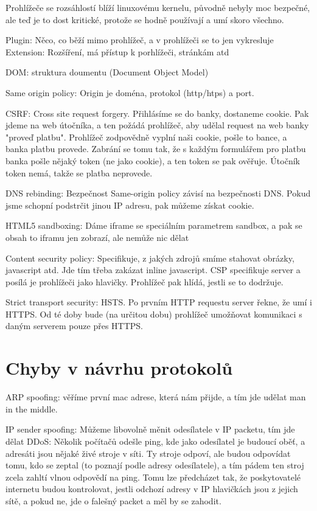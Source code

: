 Prohlížeče se rozsáhlostí blíží linuxovému kernelu, původně nebyly moc bezpečné, ale teď je to dost kritické, protože se hodně používají a umí skoro všechno.

Plugin: Něco, co běží mimo prohlížeč, a v prohlížeči se to jen vykresluje
Extension: Rozšíření, má přístup k porhlížeči, stránkám atd

DOM: struktura doumentu (Document Object Model)	

Same origin policy: Origin je doména, protokol (http/htps) a port.

CSRF: Cross site request forgery. Přihlásíme se do banky, dostaneme cookie. Pak jdeme na web útočníka, a ten požádá prohlížeč, aby udělal request na web banky "proveď platbu". Prohlížeč zodpovědně vyplní naši cookie, pošle to bance, a banka platbu provede. Zabrání se tomu tak, že s každým formulářem pro platbu banka pošle nějaký token (ne jako cookie), a ten token se pak ověřuje. Útočník token nemá, takže se platba neprovede.

DNS rebinding: Bezpečnost Same-origin policy závisí na bezpečnosti DNS. Pokud jsme schopní podstrčit jinou IP adresu, pak můžeme získat cookie.

HTML5 sandboxing: Dáme iframe se speciálním parametrem sandbox, a pak se obsah to iframu jen zobrazí, ale nemůže nic dělat

Content security policy: Specifikuje, z jakých zdrojů smíme stahovat obrázky, javascript atd. Jde tím třeba zakázat inline javascript. CSP specifikuje server a posílá je prohlížeči jako hlavičky. Prohlížeč pak hlídá, jestli se to dodržuje.

Strict transport security: HSTS. Po prvním HTTP requestu server řekne, že umí i HTTPS. Od té doby bude (na určitou dobu) prohlížeč umožňovat komunikaci s daným serverem pouze přes HTTPS.




\section{Chyby v návrhu protokolů}

ARP spoofing: věříme první mac adrese, která nám přijde, a tím jde udělat man in the middle.

IP sender spoofing: Můžeme libovolně měnit odesílatele v IP packetu, tím jde dělat DDoS: Několik počítačů odešle ping, kde jako odesílatel je budoucí oběť, a adresáti jsou nějaké živé stroje v síti. Ty stroje odpoví, ale budou odpovídat tomu, kdo se zeptal (to poznají podle adresy odesílatele), a tím pádem ten stroj zcela zahltí vlnou odpovědí na ping. Tomu lze předcházet tak, že poskytovatelé internetu budou kontrolovat, jestli odchozí adresy v IP hlavičkách jsou z jejich sítě, a pokud ne, jde o falešný packet a měl by se zahodit.

